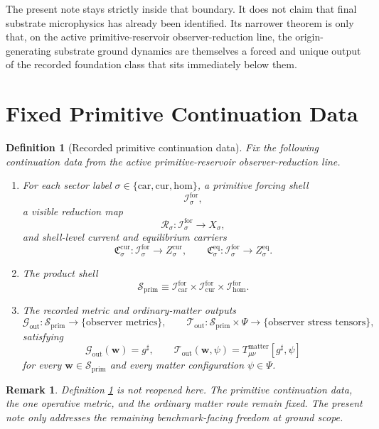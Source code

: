 \documentclass[11pt]{article}
\newcommand{\CompletedMetric}{g^{\sharp}}
\newcommand{\MatterSpace}{\Psi}
\newcommand{\Car}{\mathrm{car}}
\newcommand{\Cur}{\mathrm{cur}}
\newcommand{\Hom}{\mathrm{hom}}
\newcommand{\ForSpace}[1]{\mathcal I_{#1}^{\mathrm{for}}}
\newcommand{\PrimShell}{\mathcal S_{\mathrm{prim}}}
\newcommand{\Reduction}[1]{\mathcal R_{#1}}
\newcommand{\CurrentCarrier}[1]{\mathfrak C_{#1}^{\mathrm{cur}}}
\newcommand{\EqCarrier}[1]{\mathfrak C_{#1}^{\mathrm{eq}}}
\newcommand{\MetricOut}{\mathscr G_{\mathrm{out}}}
\newcommand{\MatterOut}{\mathscr T_{\mathrm{out}}}
\newtheorem{definition}{Definition}
\newtheorem{remark}{Remark}
\begin{document}
The present note stays strictly inside that boundary. It does not claim that final substrate microphysics has already been identified. Its narrower theorem is only that, on the active primitive-reservoir observer-reduction line, the origin-generating substrate ground dynamics are themselves a forced and unique output of the recorded foundation class that sits immediately below them.

\section{Fixed Primitive Continuation Data}

\begin{definition}[Recorded primitive continuation data]
\label{def:fixed}
Fix the following continuation data from the active primitive-reservoir observer-reduction line.
\begin{enumerate}
    \item For each sector label \(\sigma\in\{\Car,\Cur,\Hom\}\), a primitive forcing shell
    \[
    \ForSpace{\sigma},
    \]
    a visible reduction map
    \[
    \Reduction{\sigma}:\ForSpace{\sigma}\to X_{\sigma},
    \]
    and shell-level current and equilibrium carriers
    \[
    \CurrentCarrier{\sigma}:\ForSpace{\sigma}\to Z_{\sigma}^{\mathrm{cur}},
    \qquad
    \EqCarrier{\sigma}:\ForSpace{\sigma}\to Z_{\sigma}^{\mathrm{eq}}.
    \]
    \item The product shell
    \[
    \PrimShell
    \equiv
    \ForSpace{\Car}\times \ForSpace{\Cur}\times \ForSpace{\Hom}.
    \]
    \item The recorded metric and ordinary-matter outputs
    \[
    \MetricOut:\PrimShell\to\{\text{observer metrics}\},
    \qquad
    \MatterOut:\PrimShell\times\MatterSpace\to\{\text{observer stress tensors}\},
    \]
    satisfying
    \begin{equation}
    \MetricOut(\mathbf w)=\CompletedMetric,
    \qquad
    \MatterOut(\mathbf w,\psi)
    =
    T_{\mu\nu}^{\mathrm{matter}}[\CompletedMetric,\psi]
    \label{eq:fixedoutputs}
    \end{equation}
    for every \(\mathbf w\in\PrimShell\) and every matter configuration \(\psi\in\MatterSpace\).
\end{enumerate}
\end{definition}

\begin{remark}
Definition \ref{def:fixed} is not reopened here. The primitive continuation data, the one operative metric, and the ordinary matter route remain fixed. The present note only addresses the remaining benchmark-facing freedom at ground scope.
\end{remark}
\end{document}
